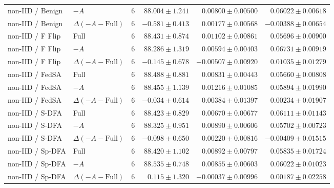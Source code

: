 \begin{table}[t]
\begin{tabular}{llrrrr}
non-IID / Benign & $-A$ & 6 & $88.004 \pm 1.241$ & $0.00800 \pm 0.00500$ & $0.06022 \pm 0.00618$ \\
non-IID / Benign & $\Delta(-A-\mathrm{Full})$ & 6 & $-0.581 \pm 0.413$ & $0.00177 \pm 0.00568$ & $-0.00388 \pm 0.00654$ \\
non-IID / F Flip & Full & 6 & $88.431 \pm 0.874$ & $0.01102 \pm 0.00861$ & $0.05696 \pm 0.00900$ \\
non-IID / F Flip & $-A$ & 6 & $88.286 \pm 1.319$ & $0.00594 \pm 0.00403$ & $0.06731 \pm 0.00919$ \\
non-IID / F Flip & $\Delta(-A-\mathrm{Full})$ & 6 & $-0.145 \pm 0.678$ & $-0.00507 \pm 0.00920$ & $0.01035 \pm 0.01279$ \\
non-IID / FedSA & Full & 6 & $88.488 \pm 0.881$ & $0.00831 \pm 0.00443$ & $0.05660 \pm 0.00808$ \\
non-IID / FedSA & $-A$ & 6 & $88.455 \pm 1.139$ & $0.01216 \pm 0.01085$ & $0.05894 \pm 0.01990$ \\
non-IID / FedSA & $\Delta(-A-\mathrm{Full})$ & 6 & $-0.034 \pm 0.614$ & $0.00384 \pm 0.01397$ & $0.00234 \pm 0.01907$ \\
non-IID / S-DFA & Full & 6 & $88.423 \pm 0.829$ & $0.00670 \pm 0.00677$ & $0.06111 \pm 0.01143$ \\
non-IID / S-DFA & $-A$ & 6 & $88.325 \pm 0.951$ & $0.00890 \pm 0.00606$ & $0.05702 \pm 0.00723$ \\
non-IID / S-DFA & $\Delta(-A-\mathrm{Full})$ & 6 & $-0.098 \pm 0.650$ & $0.00220 \pm 0.00816$ & $-0.00409 \pm 0.01515$ \\
non-IID / Sp-DFA & Full & 6 & $88.420 \pm 1.102$ & $0.00892 \pm 0.00797$ & $0.05835 \pm 0.01724$ \\
non-IID / Sp-DFA & $-A$ & 6 & $88.535 \pm 0.748$ & $0.00855 \pm 0.00603$ & $0.06022 \pm 0.01023$ \\
non-IID / Sp-DFA & $\Delta(-A-\mathrm{Full})$ & 6 & $0.115 \pm 1.320$ & $-0.00037 \pm 0.00996$ & $0.00187 \pm 0.02258$ \\
\bottomrule
\end{tabular}
\end{table}

